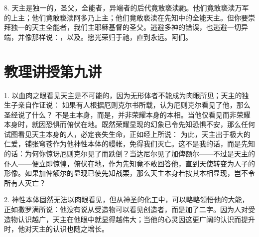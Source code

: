 8. 天主是独一的，圣父，全能者，异端者的后代竟敢亵渎祂。他们竟敢亵渎万军的上主；他们竟敢亵渎阿多乃上主；他们竟敢亵渎在先知中的全能天主。但你要崇拜独一的天主全能者，我们主耶稣基督的圣父。逃避多神的错误，也逃避一切异端，并像那样说：，以及。愿光荣归于祂，直到永远。阿们。\par



\section{教理讲授第九讲}

\par

\par

\par

1. 以血肉之眼看见天主是不可能的，因为无形体者不能成为肉眼所见；天主的独生子亲自作证说： 如果有人根据厄则克尔书所载，认为厄则克尔看见了他，那么圣经说了什么？ 不是主本身，而是，并非荣耀本身的本相。当他仅看见而非荣耀本身时，就因恐惧而俯伏在地。既然荣耀显现的幻象已令先知恐惧不安，那么任何试图看见天主本身的人，必定丧失生命，正如经上所说： 为此，天主出于极大的仁爱，铺张穹苍作为他神性本体的幔帐，免得我们灭亡。这不是我的话，而是先知的话：为何你惊讶厄则克尔见了而跌倒？当达尼尔见了加俾额尔——不过是天主的仆人——便立即惊惶，俯伏在地，作为先知竟不敢回答他，直到天使转变为人子的形像。如果加俾额尔的显现已使先知战栗，那么天主本身若按其本相显现，岂不令所有人灭亡？\par

2. 神性本体固然无法以肉眼看见，但从神圣的化工中，可以略略领悟他的大能，正如撒罗满所说：他没有说从受造物可以看见创造者，而是加了二字。因为人对受造物认识越广，天主在他眼中就显得越伟大；当他的心灵因这更广阔的认识而提升时，他对天主的认识也随之增长。\par

